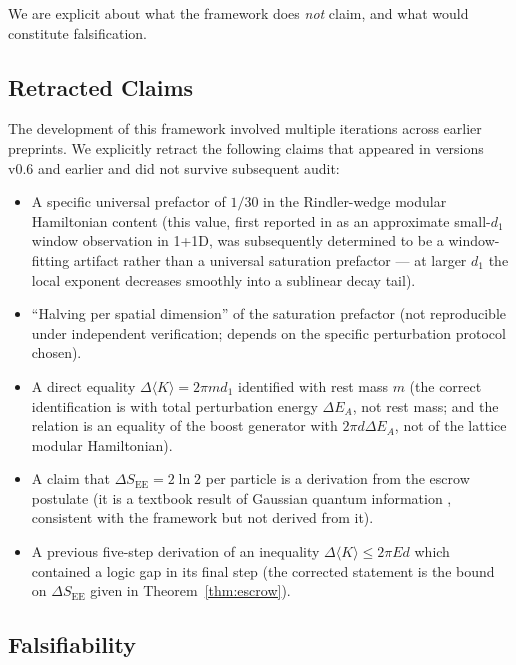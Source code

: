 \documentclass[11pt]{article}
\begin{document}
We are explicit about what the framework does \emph{not} claim, and what would constitute falsification.

\subsection{Retracted Claims}

The development of this framework involved multiple iterations across earlier preprints. We explicitly retract the following claims that appeared in versions v0.6 and earlier and did not survive subsequent audit:

\begin{itemize}
\item A specific universal prefactor of $1/30$ in the Rindler-wedge modular Hamiltonian content (this value, first reported in \cite{Whitmer2026Lattice} as an approximate small-$d_1$ window observation in 1+1D, was subsequently determined to be a window-fitting artifact rather than a universal saturation prefactor — at larger $d_1$ the local exponent decreases smoothly into a sublinear decay tail).
\item ``Halving per spatial dimension'' of the saturation prefactor (not reproducible under independent verification; depends on the specific perturbation protocol chosen).
\item A direct equality $\Delta\langle K\rangle = 2\pi m d_1$ identified with rest mass $m$ (the correct identification is with total perturbation energy $\Delta E_A$, not rest mass; and the relation is an equality of the boost generator with $2\pi d \Delta E_A$, not of the lattice modular Hamiltonian).
\item A claim that $\Delta S_{\mathrm{EE}} = 2\ln 2$ per particle is a derivation from the escrow postulate (it is a textbook result of Gaussian quantum information \cite{AdessoIlluminati2007, HolevoSohma1999}, consistent with the framework but not derived from it).
\item A previous five-step derivation of an inequality $\Delta\langle K\rangle \leq 2\pi E d$ which contained a logic gap in its final step (the corrected statement is the bound on $\Delta S_{\mathrm{EE}}$ given in Theorem~\ref{thm:escrow}).
\end{itemize}

\subsection{Falsifiability}
\end{document}
